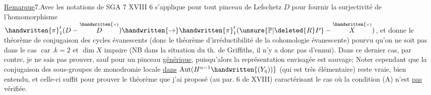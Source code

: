 \uline{Remarque}7.Avec les notations de SGA 7 XVIII\handwritten{,} 6 s'applique pour tout pinceau de Lefschetz $D$ pour fournir la surjectivité de
l'homomorphisme $\handwritten{\pi}_1^t(D-\overset{\handwritten{\scriptscriptstyle\vee}}{D})\handwritten{\rightarrow}\handwritten{\pi}_1^t(\unsure{\mathbb{P}|\deleted{R}P}-\overset{\handwritten{\scriptscriptstyle\vee}}{X})$, et donne le théorème de conjugaison des cycles évanescents (donc le théorème d'irréductibilité de la cohomologie évanescente) pourvu qu'on ne soit pas dans le cas $\operatorname{car}.k=2$ et $\dim X$ impaire (NB  dans la situation du th. de Griffiths, il n'y a donc pas d'ennui). Dans ce dernier cas, par contre, je ne sais  pas prouver, sauf pour un pinceau \uline{générique}, puisqu'alors la représentation envisagée est sauvage;  Noter cependant que la conjugaison des sous-groupes de monodromie locale \uline{dans} $\operatorname{Aut}(H^{n-1}\handwritten{(Y_{\bar{\eta}}))}$ (qui est très élémentaire) reste vraie, bien entendu, et celle-ci suffit pour prouver le théorème que j'ai proposé (au par. 6 de XVIII) caractérisant le cas où la condition (A) n'est \uline{pas} vérifiée.
